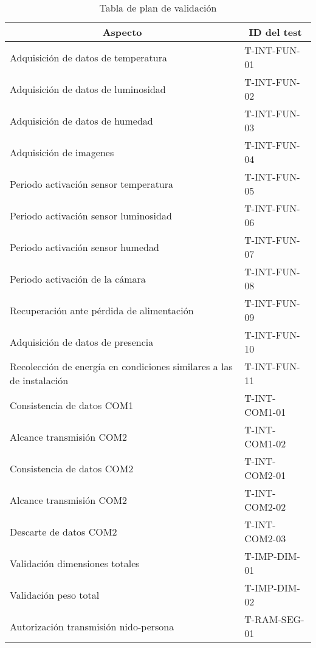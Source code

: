 \begin{table}[H]
\centering
\begin{tabular}{|l|l|}
\hline
\multicolumn{1}{|c|}{\textbf{Aspecto}}                               & \multicolumn{1}{c|}{\textbf{ID del test}} \\ \hline
Adquisición de datos de temperatura                                  & T-INT-FUN-01                              \\ \hline
Adquisición de datos de luminosidad                                  & T-INT-FUN-02                              \\ \hline
Adquisición de datos de humedad                                      & T-INT-FUN-03                              \\ \hline
Adquisición de imagenes                                              & T-INT-FUN-04                               \\ \hline
Periodo activación sensor temperatura                                & T-INT-FUN-05                              \\ \hline
Periodo activación sensor luminosidad                                & T-INT-FUN-06                              \\ \hline
Periodo activación sensor humedad                                    & T-INT-FUN-07                              \\ \hline
Periodo activación de la cámara                                      & T-INT-FUN-08                              \\ \hline
Recuperación ante pérdida de alimentación                            & T-INT-FUN-09                               \\ \hline
Adquisición de datos de presencia                                      & T-INT-FUN-10                           
\\ \hline
Recolección de energía en condiciones similares a las de instalación & T-INT-FUN-11                              
\\ \hline
Consistencia de datos COM1  & T-INT-COM1-01                            
\\ \hline
Alcance transmisión COM2 & T-INT-COM1-02                             \\ \hline
Consistencia de datos COM2             & T-INT-COM2-01                             \\ \hline
Alcance transmisión COM2  & T-INT-COM2-02                             \\ \hline
Descarte de datos COM2 & T-INT-COM2-03
 \\ \hline
Validación dimensiones totales                                       & T-IMP-DIM-01                              \\ \hline
Validación peso total                                                & T-IMP-DIM-02                              \\ \hline
Autorización transmisión nido-persona                                & T-RAM-SEG-01                              \\ \hline
\end{tabular}
\caption{Tabla de plan de validación}
\end{table}